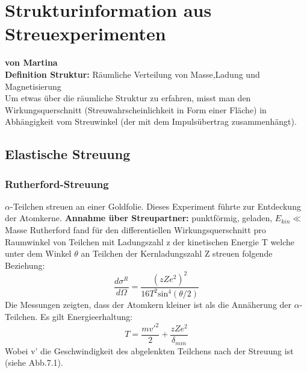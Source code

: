 \documentclass[Ex4_Zusammenfassung.tex]{subfiles}
\begin{document}
\chapter{Strukturinformation aus Streuexperimenten}
\textbf{von Martina} \\ \newline 
\textbf{Definition Struktur:} 
Räumliche Verteilung von Masse,Ladung und Magnetisierung  \\ \newline 
Um etwas über die räumliche Struktur zu erfahren, misst man den Wirkungsquerschnitt (Streuwahrscheinlichkeit in Form einer Fläche) in Abhängigkeit vom Streuwinkel (der mit dem Impulsübertrag zusammenhängt). \newline

\section{Elastische Streuung}
\subsection*{Rutherford-Streuung}
$\alpha$-Teilchen streuen an einer Goldfolie. Dieses Experiment führte zur Entdeckung der Atomkerne. \newline
\textbf{Annahme über Streupartner:} punktförmig, geladen, $E_{kin} \ll$ Masse \newline
Rutherford fand für den differentiellen Wirkungsquerschnitt pro Raumwinkel von Teilchen mit Ladungszahl z der kinetischen Energie T welche unter dem Winkel $\theta$  an Teilchen der Kernladungszahl Z streuen folgende Beziehung:
\begin{equation}
\frac{d\sigma^R}{d\Omega} = \frac{(zZe^2)^2}{16T^2 \text{sin}^4 (\theta/2)}
\end{equation}
Die Messungen zeigten, dass der Atomkern kleiner ist als die Annäherung der $\alpha$-Teilchen.
Es gilt Energieerhaltung:
\begin{equation}
T = \frac{mv'^2}{2} + \frac{zZe^2}{\delta_{min}}
\end{equation}
Wobei v' die Geschwindigkeit des abgelenkten Teilchens nach der Streuung ist (siehe Abb.7.1).
\end{document}
